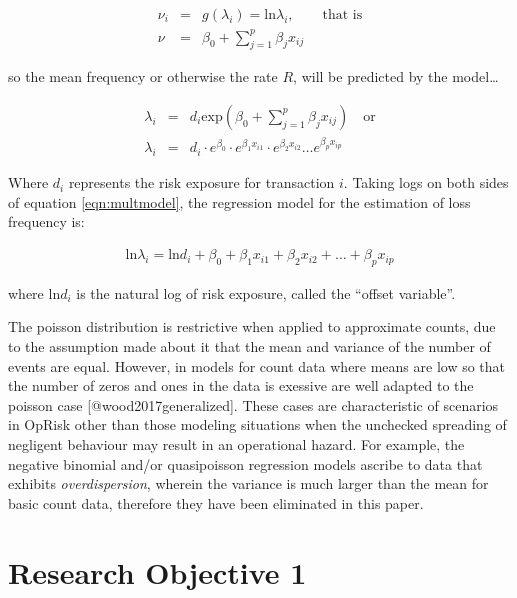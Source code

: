 \documentclass[]{article}
\begin{document}
\singlespacing

\begin{eqnarray}\label{eqn:linkfcn }
\nu_i &=& g(\lambda_i) = \mbox{ln}\lambda_i, \qquad \mbox{that is} \nonumber \\
\nu &=& \beta_0 + \sum_{j=1}^{p}\beta_jx_{ij}
\end{eqnarray} \doublespacing

so the mean frequency or otherwise the rate \(R\), will be predicted by
the model\ldots

\singlespacing

\begin{eqnarray}\label{eqn:multmodel}
\lambda_i &=& d_i\mbox{exp}(\beta_0 + \sum_{j=1}^{p}\beta_jx_{ij}) \quad \mbox{or} \nonumber \\
\lambda_i &=& d_i\cdot e^{\beta_0}\cdot e^{\beta_1x_{i1}}\cdot e^{\beta_2x_{i2}} \ldots e^{\beta_px_{ip}}
\end{eqnarray} \doublespacing

Where \(d_i\) represents the risk exposure for transaction \(i\). Taking
logs on both sides of equation \ref{eqn:multmodel}, the regression model
for the estimation of loss frequency is:

\singlespacing

\begin{eqnarray}
\mbox{ln}\lambda_i =  \mbox{ln}d_i + \beta_0 + \beta_1x_{i1} + \beta_2x_{i2} + \ldots + \beta_px_{ip}
\end{eqnarray} \doublespacing

where \(\mbox{ln}d_i\) is the natural log of risk exposure, called the
``offset variable''.

The poisson distribution is restrictive when applied to approximate
counts, due to the assumption made about it that the mean and variance
of the number of events are equal. However, in models for count data
where means are low so that the number of zeros and ones in the data is
exessive are well adapted to the poisson case
{[}@wood2017generalized{]}. These cases are characteristic of scenarios
in OpRisk other than those modeling situations when the unchecked
spreading of negligent behaviour may result in an operational hazard.
For example, the negative binomial and/or quasipoisson regression models
ascribe to data that exhibits \emph{overdispersion}, wherein the
variance is much larger than the mean for basic count data, therefore
they have been eliminated in this paper.

\section{Research Objective 1}
\label{sec:Research Objective 1}
\end{document}

